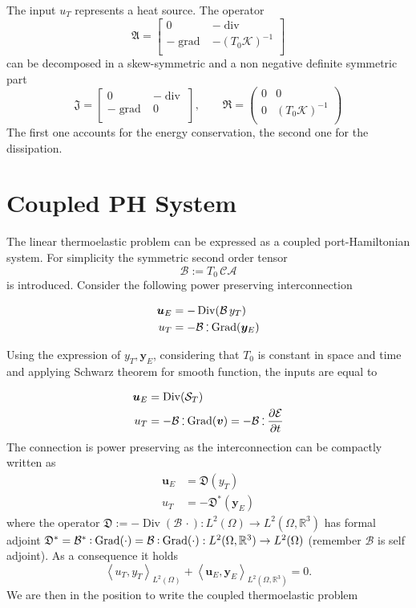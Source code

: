\documentclass[11t]{article}
\DeclareMathOperator*{\grad}{grad}
\DeclareMathOperator*{\Grad}{Grad}
\DeclareMathOperator*{\Div}{Div}
\renewcommand{\div}{\operatorname{div}}
\def\onedot{$\mathsurround0pt\ldotp$}
\def\cddot{%
	\mathbin{\vcenter{\baselineskip.67ex
			\hbox{\onedot}\hbox{\onedot}}%
}}
\begin{document}
The input $u_T$ represents a heat source. The operator 
\[
\mathfrak{A} = \begin{bmatrix}
0 & -\div \\
-\grad & - (T_0 \mathcal{K})^{-1} \\
\end{bmatrix}
\]
can be decomposed in a skew-symmetric and a non negative definite symmetric part
\[
\mathfrak{J} = \begin{bmatrix}
0 & -\div \\
-\grad & 0 \\
\end{bmatrix}, \qquad
\mathfrak{R} = \begin{pmatrix}
0 & 0 \\
0 & (T_0 \mathcal{K})^{-1} \\
\end{pmatrix}
\]
The first one accounts for the energy conservation, the second one for the dissipation.

\section{Coupled PH System}
The linear thermoelastic problem can be expressed as a coupled port-Hamiltonian system. For simplicity the symmetric second order tensor 
\[\mathcal{B}:=T_0 \, \mathcal{C} \mathcal{A}\]
 is introduced.
 Consider the following power preserving interconnection

\begin{align}
\bm{u}_E &= - \Div(\mathcal{B} \, y_T) \\
u_T &= - \mathcal{B} \cddot\Grad(\bm{y}_E) 
\end{align}

Using the expression of $y_T, \bm{y}_E$, considering that $T_0$ is constant in space and time and applying Schwarz theorem for smooth function, the inputs are equal to

\begin{align*}
\bm{u}_E &=  \Div(\mathcal{S}_T) \\
u_T &= - \mathcal{B} \cddot  \Grad(\bm{v}) = - \mathcal{B} \cddot  \diffp{\mathcal{E}}{t} 
\end{align*}
The connection is power preserving as the interconnection can be compactly written as 
\begin{align}
\bm{u}_E &= \mathfrak{D}(y_T) \\
u_T &= - \mathfrak{D}^*(\bm{y}_E) 
\end{align}
where the operator $\mathfrak{D} := - \Div(\mathcal{B} \, \cdot) : L^2(\Omega) \rightarrow L^2(\Omega, \mathbb{R}^3)$ has formal adjoint $ \mathfrak{D}^* =  \mathcal{B}^* \cddot  \Grad(\cdot) =  \mathcal{B} \cddot  \Grad(\cdot): L^2(\Omega, \mathbb{R}^3) \rightarrow L^2(\Omega)$ (remember $\mathcal{B}$ is self adjoint). As a consequence it holds
\[
\left\langle u_T, y_T \right\rangle_{L^2(\Omega)} + \left\langle \bm{u}_E, \bm{y}_E \right\rangle_{L^2(\Omega, \mathbb{R}^3)} = 0.
\]
 We are then in the position to write the coupled thermoelastic problem 
\end{document}
